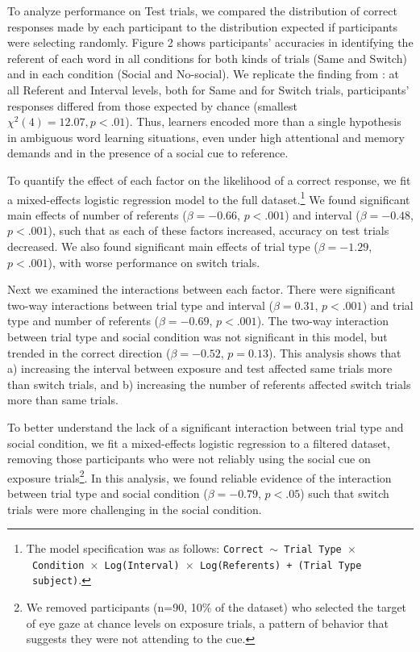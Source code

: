 \documentclass[10pt,letterpaper]{article}
\begin{document}
To analyze performance on Test trials, we compared the distribution of correct responses made by each participant to the distribution expected if participants were selecting randomly. Figure 2 shows participants' accuracies in identifying the referent of each word in all conditions for both kinds of trials (Same and Switch) and in each condition (Social and No-social). We replicate the finding from : at all Referent and Interval levels, both for Same and for Switch trials, participants' responses differed from those expected by chance (smallest $\chi^{2}(4) = 12.07, p < .01$). Thus, learners encoded more than a single hypothesis in ambiguous word learning situations, even under high attentional and memory demands and in the presence of a social cue to reference. 

To quantify the effect of each factor on the likelihood of a correct response, we fit a mixed-effects logistic regression model to the full dataset.\footnote{The model specification was as follows: \texttt{Correct $\sim$ Trial Type~$\times$~Condition~$\times$~Log(Interval)~$\times$~Log(Referents) + (Trial Type \textbar~subject)}.} We found significant main effects of number of referents ($\beta= -0.66$, $p< .001$) and interval ($\beta= -0.48$, $p< .001$), such that as each of these factors increased, accuracy on test trials decreased. We also found significant main effects of trial type ($\beta= -1.29$, $p< .001$), with worse performance on switch trials. 

Next we examined the interactions between each factor. There were significant two-way interactions between trial type and interval ($\beta= 0.31$, $p< .001$) and trial type and number of referents ($\beta=-0.69$, $p< .001$). The two-way interaction between trial type and social condition was not significant in this model, but trended in the correct direction ($\beta= -0.52$, $p=0.13$). This analysis shows that a) increasing the interval between exposure and test affected same trials more than switch trials, and b) increasing the number of referents affected switch trials more than same trials.  

To better understand the lack of a significant interaction between trial type and social condition,  we fit a mixed-effects logistic regression to a filtered dataset, removing those participants who were not reliably using the social cue on exposure trials\footnote{We removed participants (n=90, 10\% of the dataset) who selected the target of eye gaze at chance levels on exposure trials, a pattern of behavior that suggests they were not attending to the cue.}. In this analysis, we found reliable evidence of the interaction between trial type and social condition ($\beta= -0.79$, $p< .05$) such that switch trials were more challenging in the social condition.
\end{document}

